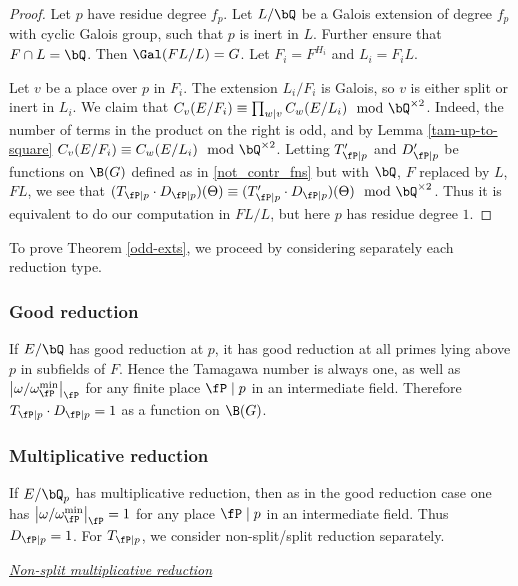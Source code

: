 \begin{proof}
Let $p$ have residue degree $f_p$. Let $L / \bQ$ be a Galois extension of degree $f_p$ with cyclic Galois group, such that $p$ is inert in $L$. Further ensure that $F \cap L = \bQ$. Then $\Gal(FL / L) = G$. Let $F_i = F^{H_i}$ and $L_i = F_i L$.

Let $v$ be a place over $p$ in $F_i$. The extension $L_i / F_i$ is Galois, so $v$ is either split or inert in $L_i$.
We claim that $C_v(E / F_i) \equiv \prod_{w | v} C_w(E / L_i) \mod \bQ^{\times 2}$. Indeed, the number of terms in the product on the right is odd, and by Lemma \ref{tam-up-to-square} $C_v(E / F_i) \equiv C_w(E / L_i) \mod \bQ^{\times 2}$. 
Letting $T_{\fP \mid p}'$ and $D_{\fP \mid p}'$ be functions on $\B(G)$ defined as in \eqref{not_contr_fns} but with $\bQ$, $F$ replaced by $L$, $FL$, we see that $(T_{\fP \mid p} \cdot D_{{\fP \mid p}})(\Theta) \equiv (T_{\fP \mid p}' \cdot D_{\fP \mid p})(\Theta) \mod \bQ^{\times 2}$. 
Thus it is equivalent to do our computation in $FL / L$, but here $p$ has residue degree $1$.
\end{proof}

To prove Theorem \ref{odd-exts}, we proceed by considering separately each reduction type.

\subsubsection*{Good reduction}
If $E / \bQ$ has good reduction at $p$, it has good reduction at all primes lying above $p$ in subfields of $F$. Hence the Tamagawa number is always one, as well as $\left|\omega / \omega_{\fP}^{\min}\right|_{\fP}$ for any finite place $\fP \mid p$ in an intermediate field. Therefore $T_{\fP \mid p} \cdot D_{\fP \mid p} = 1$ as a  function on $\B(G)$.

\subsubsection*{Multiplicative reduction}

If $E / \bQ_p$ has multiplicative reduction, then as in the good reduction case one has $\left|\omega / \omega_{\fP}^{\min}\right|_{\fP} = 1$ for any place $\fP \mid p$ in an intermediate field. Thus $D_{\fP \mid p} = 1$.
For $T_{\fP \mid p}$, we consider non-split/split reduction separately.
\vspace{1em}

\noindent\underline{\textit{Non-split multiplicative reduction}}

